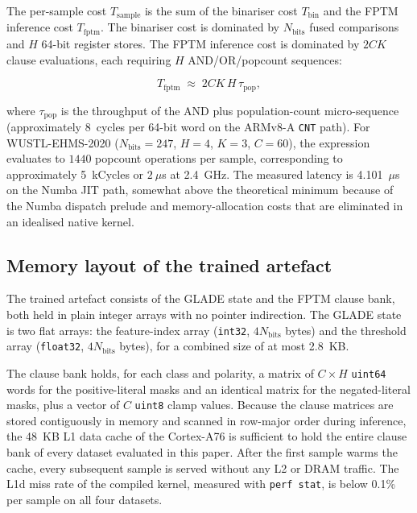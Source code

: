 \documentclass[journal,10pt]{IEEEtran}
\begin{document}
The per-sample cost $T_\text{sample}$ is the sum of the binariser
cost $T_\text{bin}$ and the FPTM inference cost $T_\text{fptm}$.
The binariser cost is dominated by $N_\text{bits}$ fused comparisons
and $H$ 64-bit register stores. The FPTM inference cost is dominated
by $2CK$ clause evaluations, each requiring $H$ AND/OR/popcount
sequences:

\begin{equation}
  T_\text{fptm} \;\approx\; 2CK\,H\,\tau_\text{pop},
  \label{eq:fptmcost}
\end{equation}

\noindent where $\tau_\text{pop}$ is the throughput of the AND plus
population-count micro-sequence (approximately 8~cycles per 64-bit
word on the ARMv8-A \texttt{CNT} path). For WUSTL-EHMS-2020
($N_\text{bits}=247$, $H=4$, $K=3$, $C=60$), the expression
evaluates to $1440$ popcount operations per sample, corresponding
to approximately 5~kCycles or $2~\mu$s at 2.4~GHz. The measured
latency is 4.101~$\mu$s on the Numba JIT path, somewhat above the
theoretical minimum because of the Numba dispatch prelude and
memory-allocation costs that are eliminated in an idealised native kernel.

\subsection{Memory layout of the trained artefact}
\label{sec:hw-layout}

The trained artefact consists of the GLADE state and the FPTM clause
bank, both held in plain integer arrays with no pointer indirection.
The GLADE state is two flat arrays: the feature-index array
(\texttt{int32}, $4N_\text{bits}$ bytes) and the threshold array
(\texttt{float32}, $4N_\text{bits}$ bytes), for a combined size of
at most 2.8~KB.

The clause bank holds, for each class and polarity, a matrix of
$C \times H$ \texttt{uint64} words for the positive-literal masks and
an identical matrix for the negated-literal masks, plus a vector of
$C$ \texttt{uint8} clamp values. Because the clause matrices are
stored contiguously in memory and scanned in row-major order during
inference, the 48~KB L1 data cache of the Cortex-A76 is sufficient to
hold the entire clause bank of every dataset evaluated in this paper.
After the first sample warms the cache, every subsequent sample is
served without any L2 or DRAM traffic. The L1d miss rate of the
compiled kernel, measured with \texttt{perf stat}, is below 0.1\% per
sample on all four datasets.
\end{document}
